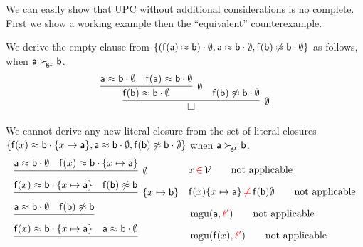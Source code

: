 

\noindent We can easily show that UPC without additional considerations is no complete.
First we show a working example then the “equivalent” counterexample.

\begin{example}
    We derive the empty clause from
       \( \{
           (\mathsf{f}(\mathsf{a})\approx\mathsf{b}) \cdot\emptyset, 
           \mathsf{a}\approx \mathsf{b} \cdot\emptyset,
           \mathsf{f}(\mathsf{b})\not\approx\mathsf{b} \cdot\emptyset
        \} \) as follows, when \( \mathsf{a}\mathrel\succ_{\!\mathtt{gr}}\mathsf{b} \).
\begin{gather*}
    \infer[\emptyset]{\emptyclause}{
       \infer[\emptyset]{
           \mf(\mb)\mEQ\mb\cdot\emptyset
        }{
            \ma\mEQ\mb\cdot\emptyset & \mf(\ma)\mEQ \mb\cdot\emptyset
        }
        & \mf(\mb)\mNE\mb\cdot\emptyset
    }
\end{gather*}
\end{example}

\begin{example}
        We cannot derive any new literal closure from the set of literal closures
       \( \{
           \mathsf{f}(x)\approx\mathsf{b} \cdot\{ x\mapsto\mathsf{a} \},
           \mathsf{a}\approx \mathsf{b} \cdot\emptyset,
           \mathsf{f}(\mathsf{b})\not\approx\mathsf{b} \cdot\emptyset
       \} \) 
       when \( \mathsf{a}\mathrel\succ_{\!\mathtt{gr}}\mathsf{b} \). 
\begin{align*}
    &
       \infer[\emptyset]{
        }{
            \ma\mEQ\mb\cdot\emptyset 
            & \mf(x)\mEQ \mb\cdot\{ x\mapsto \ma\}
        }
        &&
        x\,{\colLo\in}\,\mcV
        \tag*{not applicable}
        \\
    &
        \infer[\{ x\mapsto\mb \}]{
        }{
            \mf(x)\mEQ \mb\cdot\{ x\mapsto \ma\}
            & \mf(\mb) \mNE \mb
        }
        &&
            \mf(x) \{ x\mapsto\ma \} 
            \,{\colLo\neq}\, \mf(\mb) \emptyset
        \tag*{not applicable}
    \\
    &
    \infer[]{}{
        \ma\mEQ\mb\cdot\emptyset 
        & \mf(\mb) \mNE \mb
    }
    && \mgu(\ma, {\colLo\ell'})
    \tag*{not applicable}
    \\
    &
    \infer[]{}{
        \mf(x)\mEQ \mb\cdot\{ x\mapsto \ma\}
        & \ma\mEQ\mb\cdot\emptyset
    }
    && \mgu(\mf(x), {\colLo\ell'})
    \tag*{not applicable}
\end{align*}
           \end{example}

